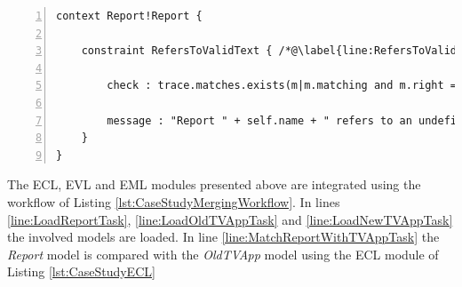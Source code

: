 \begin{lstlisting}[float=tbp, basicstyle=\ttfamily\footnotesize, flexiblecolumns=true, numbers=left, nolol=true, caption=EVL module that validates a Report model against a TVApp model, label=lst:ValidateReport, language=EVL, tabsize=2]
context Report!Report {
	
	constraint RefersToValidText { /*@\label{line:RefersToValidText}@*/
		
		check : trace.matches.exists(m|m.matching and m.right = self)
		
		message : "Report " + self.name + " refers to an undefined text"	
	}
}
\end{lstlisting}

The ECL, EVL and EML modules presented above are integrated using the workflow of Listing \ref{lst:CaseStudyMergingWorkflow}. In lines \ref{line:LoadReportTask}, \ref{line:LoadOldTVAppTask} and \ref{line:LoadNewTVAppTask} the involved models are loaded. In line 
\ref{line:MatchReportWithTVAppTask} the \emph{Report} model is compared with the \emph{OldTVApp} model using the ECL module of Listing \ref{lst:CaseStudyECL}

